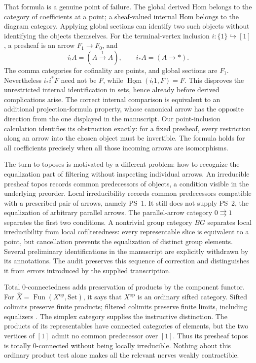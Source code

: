 That formula is a genuine point of failure. The global derived Hom belongs to the category of coefficients at a point; a sheaf-valued internal Hom belongs to the diagram category. Applying global sections can identify two such objects without identifying the objects themselves. For the terminal-vertex inclusion $i:\{1\}\hookrightarrow[1]$, a presheaf is an arrow $F_1\to F_0$, and
\[
 i_!A=(A\xrightarrow{1}A),\qquad i_*A=(A\to *).
\]
The comma categories for cofinality are points, and global sections are $F_1$. Nevertheless $i_*i^*F$ need not be $F$, while $\underline{\operatorname{Hom}}(i_!1,F)=F$. This disproves the unrestricted internal identification in sets, hence already before derived complications arise. The correct internal comparison is equivalent to an additional projection-formula property, whose canonical arrow has the opposite direction from the one displayed in the manuscript. Our point-inclusion calculation identifies its obstruction exactly: for a fixed presheaf, every restriction along an arrow into the chosen object must be invertible. The formula holds for all coefficients precisely when all those incoming arrows are isomorphisms.

The turn to toposes is motivated by a different problem: how to recognize the equalization part of filtering without inspecting individual arrows. An irreducible presheaf topos records common predecessors of objects, a condition visible in the underlying preorder. Local irreducibility records common predecessors compatible with a prescribed pair of arrows, namely PS~1. It still does not supply PS~2, the equalization of arbitrary parallel arrows. The parallel-arrow category $0\rightrightarrows1$ separates the first two conditions. A nontrivial group category $BG$ separates local irreducibility from local cofilteredness: every representable slice is equivalent to a point, but cancellation prevents the equalization of distinct group elements. Several preliminary identifications in the manuscript are explicitly withdrawn by its annotations. The audit preserves this sequence of correction and distinguishes it from errors introduced by the supplied transcription.

Total $0$-connectedness adds preservation of products by the component functor. For $\widehat X=\operatorname{Fun}(X^{\mathrm{op}},\mathrm{Set})$, it says that $X^{\mathrm{op}}$ is an ordinary sifted category. Sifted colimits preserve finite products; filtered colimits preserve finite limits, including equalizers \citep{AdamekRosickyVitale2010}. The simplex category supplies the instructive distinction. The products of its representables have connected categories of elements, but the two vertices of $[1]$ admit no common predecessor over $[1]$. Thus its presheaf topos is totally $0$-connected without being locally irreducible. Nothing about this ordinary product test alone makes all the relevant nerves weakly contractible.

